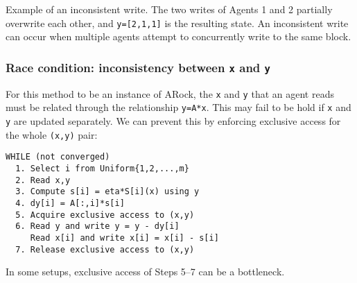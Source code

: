 \documentclass[10pt,mathserif]{beamer}
\begin{document}
\begin{frame}
\begin{center}
    \end{center}

Example of an inconsistent write.
The two writes of Agents 1 and 2 partially overwrite each other, and \texttt{y=[2,1,1]} is the resulting state.
An inconsistent write can occur when multiple agents attempt to concurrently write to the same block. 
\end{frame}



\begin{frame}[fragile]
\frametitle{Race condition: inconsistency between \texttt{x} and \texttt{y}}
For this method to be an instance of ARock, the \verb|x| and \verb|y| that an agent reads must be related through the relationship \verb|y=A*x|.
This may fail to be hold if \verb|x| and \verb|y| are updated separately.
We can prevent this by enforcing exclusive  access for the whole \verb|(x,y)| pair:
\begin{lstlisting}
WHILE (not converged)
  1. Select i from Uniform{1,2,...,m}
  2. Read x,y
  3. Compute s[i] = eta*S[i](x) using y
  4. dy[i] = A[:,i]*s[i]
  5. Acquire exclusive access to (x,y)
  6. Read y and write y = y - dy[i]
     Read x[i] and write x[i] = x[i] - s[i]
  7. Release exclusive access to (x,y)
\end{lstlisting}


In some setups, exclusive access of Steps 5--7 can be a bottleneck.
\end{frame}
\end{document}
